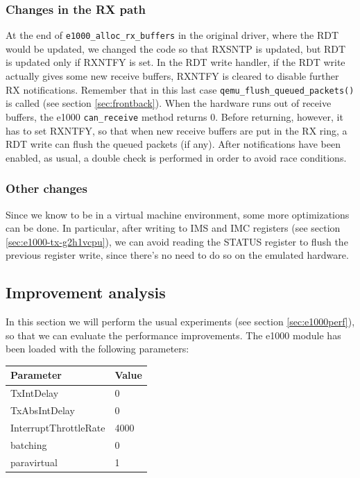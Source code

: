 \subsubsection{Changes in the RX path}
At the end of \texttt{e1000\_alloc\_rx\_buffers} in the original driver, where the RDT would be updated, we changed the code so that
RXSNTP is updated, but RDT is updated only if RXNTFY is set.
In the RDT write handler, if the RDT write actually gives some new receive buffers, RXNTFY is cleared to disable further RX notifications.
Remember that in this last case \texttt{qemu\_flush\_queued\_packets()} is called (see section \ref{sec:frontback}). 
When the hardware runs out of receive buffers, the e1000 \texttt{can\_receive} method returns 0. Before returning, however, it has to
set RXNTFY, so that when new receive buffers are put in the RX ring, a RDT write can flush the queued packets (if any).
After notifications have been enabled, as usual, a double check is performed in order to avoid race conditions.


\subsubsection{Other changes}
Since we know to be in a virtual machine environment, some more optimizations can be done.
In particular, after writing to IMS and IMC registers (see section \ref{sec:e1000-tx-g2h1vcpu}), we can avoid reading the STATUS register
to flush the previous register write, since there's no need to do so on the emulated hardware.


\subsection{Improvement analysis}
In this section we will perform the usual experiments (see section \ref{sec:e1000perf}), so that we can evaluate the performance
improvements. The e1000 module has been loaded with the following parameters:
\begin{center}
\begin{tabular}{ll}
\toprule
\textbf{Parameter} & \textbf{Value}\\
\midrule
TxIntDelay & 0\\
TxAbsIntDelay & 0\\
InterruptThrottleRate & 4000\\
batching & 0\\
paravirtual & 1\\
\bottomrule
\end{tabular}
\end{center}


